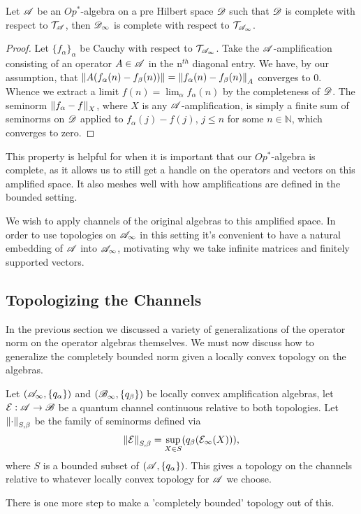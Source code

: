 \documentclass[../main.tex]{subfiles}
\begin{document}
\begin{proposition}

Let $\mathscr{A}$ be an $Op^*$-algebra on a pre Hilbert space $\mathscr{D}$ such that $\mathscr{D}$ is 
complete with respect to $\mathcal{T}_\mathscr{A}$, then $\mathscr{D}_\infty$ is complete with 
respect to $\mathcal{T}_{\mathscr{A}_\infty}$.

\begin{proof}

	Let $\{f_\alpha\}_\alpha$ be Cauchy with respect to 
	$\mathcal{T}_{\mathscr{A}_\infty}$. Take the $\mathscr{A}$-amplification consisting 
	of an operator $A \in \mathscr{A}$ in the n$^{th}$ diagonal entry. We have, by our 
	assumption, that 
	$\left\lVert A(f_\alpha(n) - f_\beta(n))\right\rVert = \left\lVert f_\alpha(n) - f_\beta(n)\right\rVert_A$ 
	converges to 0. Whence we extract a limit $f(n) = \lim_\alpha f_\alpha(n)$ by
	the completeness of $\mathscr{D}$. The seminorm $\left\lVert f_\alpha - f\right\rVert_X$, 
	where $X$ is any $\mathscr{A}$-amplification, is simply a finite sum of seminorms 
	on $\mathscr{D}$ applied to $f_\alpha(j) - f(j)$, $j \le n$ for some 
	$n \in \mathbb{N}$, which converges to zero.
\end{proof}

\end{proposition}

This property is helpful for when it is important that our $Op^*$-algebra is complete, as it allows us to still get a handle on the operators and vectors on this amplified space. 
It also meshes well with how amplifications are defined in the bounded setting.

We wish to apply channels of the original algebras to this amplified space. In
order to use topologies on $\mathscr{A}_\infty$ in this setting it's convenient to have a
natural embedding of $\mathscr{A}$ into $\mathscr{A}_\infty$, motivating why we take infinite matrices
and finitely supported vectors.

\subsection{Topologizing the Channels}

In the previous section we discussed a variety of generalizations of the operator norm
on the operator algebras themselves. We must now discuss how to generalize the completely
bounded norm given a locally convex topology on the algebras.

Let $(\mathscr{A}_\infty, \{q_\alpha\})$ and $(\mathscr{B}_\infty, \{q_\beta\})$
be locally convex amplification algebras, let $\mathcal{E}:\mathscr{A} \to \mathscr{B}$ be a quantum
channel continuous relative to both topologies. Let $\left\lVert\cdot\right\rVert_{S,\beta}$
be the family of seminorms defined via 
\[\left\lVert\mathcal{E}\right\rVert_{S, \beta} = \sup_{X \in S}(q_\beta(\mathcal{E}_\infty(X))),\]
where $S$ is a bounded subset of $(\mathscr{A}, \{q_\alpha\})$. This gives a topology 
on the channels relative to whatever locally convex topology for $\mathscr{A}$ we choose. 

There is one more step to make a 'completely bounded' topology out of this.
\end{document}
